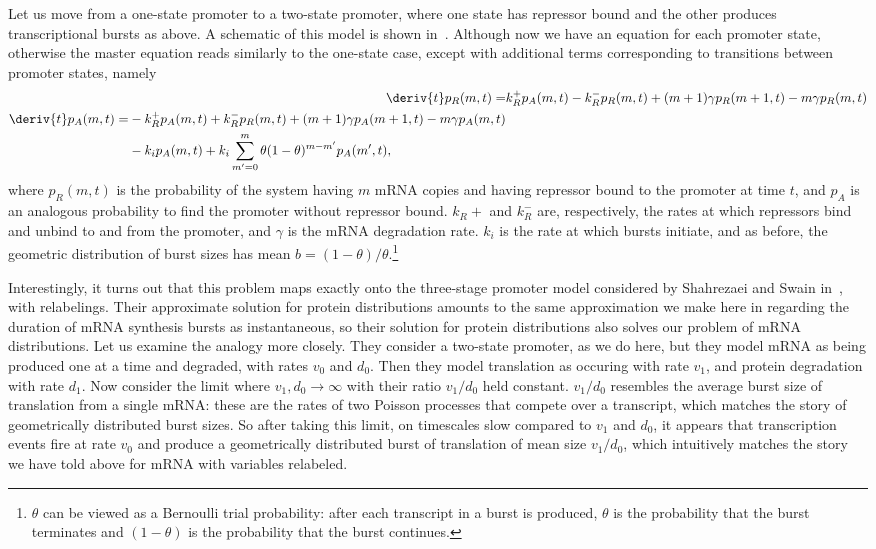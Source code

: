 Let us move from a one-state promoter to a two-state promoter, where one state
has repressor bound and the other produces transcriptional bursts as above.
A schematic of this model is shown in~.
Although now we have an equation for each promoter state, otherwise
the master equation reads similarly to the one-state case, except with
additional terms corresponding to transitions between promoter states, namely
\begin{align}
\deriv{t}p_R(m,t) =& k_R^+ p_A(m,t) - k_R^- p_R(m,t)
        + (m+1)\gamma p_R(m+1,t) - m\gamma p_R(m,t)
\\
\begin{split}
\deriv{t}p_A(m,t) =& - k_R^+ p_A(m,t) + k_R^- p_R(m,t)
        + (m+1)\gamma p_A(m+1,t) - m\gamma p_A(m,t) 
\\
&- k_i p_A(m,t) + k_i \sum_{m^\prime=0}^m \theta(1-\theta)^{m-m^\prime} p_A(m^\prime,t),
\end{split}
\end{align}
where $p_R(m,t)$ is the probability of the system having $m$ mRNA copies
and having repressor bound to the promoter at time $t$, and $p_A$ is an
analogous probability to find the promoter without repressor bound.
$k_R+$ and $k_R^-$ are, respectively, the rates at which repressors
bind and unbind to and from the promoter, and
$\gamma$ is the mRNA degradation rate.
$k_i$ is the rate at which bursts initiate, and as before,
the geometric distribution of burst sizes has mean $b=(1-\theta)/\theta$.\footnote{
$\theta$ can be viewed as a Bernoulli trial probability: after each transcript
in a burst is produced, $\theta$ is the probability that the burst
terminates and $(1-\theta)$ is the probability that the burst continues.
}

Interestingly, it turns out that this problem maps exactly onto the
three-stage promoter model considered by
Shahrezaei and Swain in~\cite{Shahrezaei2008}, with relabelings.
Their approximate solution for protein distributions amounts to
the same approximation we make here in regarding the duration
of mRNA synthesis bursts as instantaneous, so their solution
for protein distributions also solves our problem of mRNA distributions.
Let us examine the analogy more closely.
They consider a two-state promoter, as we do here, but they model
mRNA as being produced one at a time and degraded, with rates
$v_0$ and $d_0$.
Then they model translation as occuring with rate $v_1$,
and protein degradation with rate $d_1$.
Now consider the limit where $v_1, d_0\rightarrow\infty$ with
their ratio $v_1/d_0$ held constant.
$v_1/d_0$ resembles the average burst size of translation from a single
mRNA: these are the rates of two Poisson processes that compete over a
transcript, which matches the story of geometrically distributed burst sizes.
So after taking this limit, on timescales slow compared to $v_1$ and $d_0$,
it appears that transcription events fire at rate $v_0$ and produce a
geometrically distributed burst of translation of mean size $v_1/d_0$,
which intuitively matches the story we have told above for mRNA
with variables relabeled.

